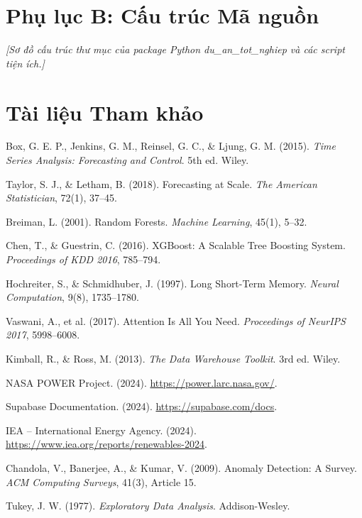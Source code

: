 \documentclass[12pt, a4paper]{report}
\begin{document}
\chapter*{Phụ lục B: Cấu trúc Mã nguồn}
\label{app:code}
\textit{[Sơ đồ cấu trúc thư mục của package Python du\_an\_tot\_nghiep và các script tiện ích.]}


\chapter*{Tài liệu Tham khảo}
\label{chap:thamkhao}

\begin{enumerate}[label={[\arabic*]}, noitemsep]
    \item Box, G. E. P., Jenkins, G. M., Reinsel, G. C., \& Ljung, G. M. (2015). \textit{Time Series Analysis: Forecasting and Control}. 5th ed. Wiley.
    \item Taylor, S. J., \& Letham, B. (2018). Forecasting at Scale. \textit{The American Statistician}, 72(1), 37--45.
    \item Breiman, L. (2001). Random Forests. \textit{Machine Learning}, 45(1), 5--32.
    \item Chen, T., \& Guestrin, C. (2016). XGBoost: A Scalable Tree Boosting System. \textit{Proceedings of KDD 2016}, 785--794.
    \item Hochreiter, S., \& Schmidhuber, J. (1997). Long Short-Term Memory. \textit{Neural Computation}, 9(8), 1735--1780.
    \item Vaswani, A., et al. (2017). Attention Is All You Need. \textit{Proceedings of NeurIPS 2017}, 5998--6008.
    \item Kimball, R., \& Ross, M. (2013). \textit{The Data Warehouse Toolkit}. 3rd ed. Wiley.
    \item NASA POWER Project. (2024). \url{https://power.larc.nasa.gov/}.
    \item Supabase Documentation. (2024). \url{https://supabase.com/docs}.
    \item IEA -- International Energy Agency. (2024). \url{https://www.iea.org/reports/renewables-2024}.
    \item Chandola, V., Banerjee, A., \& Kumar, V. (2009). Anomaly Detection: A Survey. \textit{ACM Computing Surveys}, 41(3), Article 15.
    \item Tukey, J. W. (1977). \textit{Exploratory Data Analysis}. Addison-Wesley.
\end{enumerate}
\end{document}
